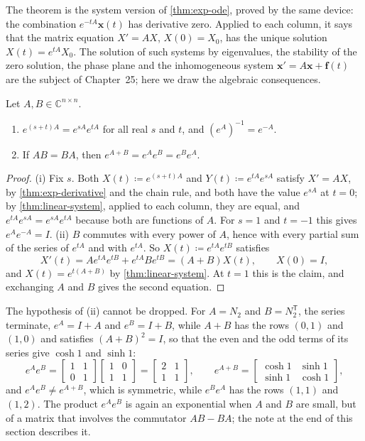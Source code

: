 The theorem is the system version of \cref{thm:exp-ode}, proved by the same device: the combination $e^{-tA}\mathbf x(t)$ has derivative zero. Applied to each column, it says that the matrix equation $X'=AX$, $X(0)=X_0$, has the unique solution $X(t)=e^{tA}X_0$. The solution of such systems by eigenvalues, the stability of the zero solution, the phase plane and the inhomogeneous system $\mathbf x'=A\mathbf x+\mathbf f(t)$ are the subject of Chapter~25; here we draw the algebraic consequences.


\begin{corollary}
\label{cor:exp-laws}
Let $A,B\in\mathbb C^{n\times n}$.
\begin{enumerate}
\item $e^{(s+t)A}=e^{sA}e^{tA}$ for all real $s$ and $t$, and $(e^A)^{-1}=e^{-A}$.
\item If $AB=BA$, then $e^{A+B}=e^Ae^B=e^Be^A$.
\end{enumerate}
\end{corollary}

\begin{proof}
(i) Fix $s$. Both $X(t)\coloneqq e^{(s+t)A}$ and $Y(t)\coloneqq e^{tA}e^{sA}$ satisfy $X'=AX$, by \cref{thm:exp-derivative} and the chain rule, and both have the value $e^{sA}$ at $t=0$; by \cref{thm:linear-system}, applied to each column, they are equal, and $e^{tA}e^{sA}=e^{sA}e^{tA}$ because both are functions of $A$. For $s=1$ and $t=-1$ this gives $e^Ae^{-A}=I$. (ii) $B$ commutes with every power of $A$, hence with every partial sum of the series of $e^{tA}$ and with $e^{tA}$. So $X(t)\coloneqq e^{tA}e^{tB}$ satisfies
\[
X'(t)=Ae^{tA}e^{tB}+e^{tA}Be^{tB}=(A+B)X(t),\qquad X(0)=I ,
\]
and $X(t)=e^{t(A+B)}$ by \cref{thm:linear-system}. At $t=1$ this is the claim, and exchanging $A$ and $B$ gives the second equation.
\end{proof}

The hypothesis of (ii) cannot be dropped. For $A=N_2$ and $B=N_2^{\mathsf T}$, the series terminate, $e^A=I+A$ and $e^B=I+B$, while $A+B$ has the rows $(0,1)$ and $(1,0)$ and satisfies $(A+B)^2=I$, so that the even and the odd terms of its series give $\cosh1$ and $\sinh1$:
\[
e^Ae^B=\begin{bmatrix}1&1\\0&1\end{bmatrix}\begin{bmatrix}1&0\\1&1\end{bmatrix}=\begin{bmatrix}2&1\\1&1\end{bmatrix},\qquad e^{A+B}=\begin{bmatrix}\cosh1&\sinh1\\\sinh1&\cosh1\end{bmatrix},
\]
and $e^Ae^B\ne e^{A+B}$, which is symmetric, while $e^Be^A$ has the rows $(1,1)$ and $(1,2)$. The product $e^Ae^B$ is again an exponential when $A$ and $B$ are small, but of a matrix that involves the commutator $AB-BA$; the note at the end of this section describes it.


